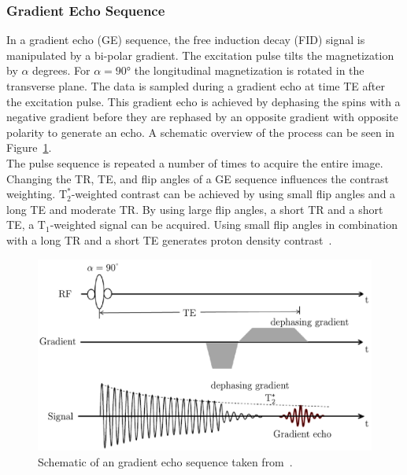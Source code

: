 \subsubsection{Gradient Echo Sequence}
In a gradient echo (GE) sequence, the free induction decay (FID) signal is manipulated by a bi-polar gradient. The excitation pulse tilts the magnetization by $\alpha$ degrees. For $\alpha = 90°$ the longitudinal magnetization is rotated in the transverse plane. The data is sampled during a gradient echo at time TE after the excitation pulse. This gradient echo is achieved by dephasing the spins with a negative gradient before they are rephased by an opposite gradient with opposite polarity to generate an echo. A schematic overview of the process can be seen in Figure~\ref{fig:GradientEcho}. \\
The pulse sequence is repeated a number of times to acquire the entire image. 
Changing the TR, TE, and flip angles of a GE sequence influences the contrast weighting. $\text{T}^*_2$-weighted contrast can be achieved by using small flip angles and a long TE and moderate TR. By using large flip angles, a short TR and a short TE, a $\text{T}_1$-weighted signal can be acquired. Using small flip angles in combination with a long TR and a short TE generates proton density contrast~\cite{PulseSequences}.%

\begin{figure}[htpb]
	\centering
	\includegraphics[width=\linewidth]{./Images/GradientEcho.pdf} 
	\caption{Schematic of an gradient echo sequence taken from~\cite{PulseSequences}.}
	\label{fig:GradientEcho}
\end{figure}

